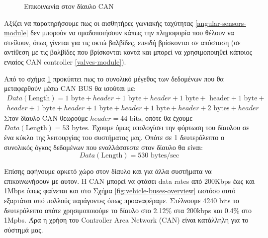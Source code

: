 \documentclass{article}
\begin{document}
\begin{figure}[H]
\caption{Επικοινωνία στον δίαυλο CAN}
\label{fig:inner-communications}
\end{figure}

Αξίζει να παρατηρήσουμε πως οι αισθητήρες γωνιακής ταχύτητας \ref{angular-sensors-module} δεν μπορούν να ομαδοποιήσουν κάπως την πληροφορία που θέλουν να στείλουν, όπως γίνεται για τις οκτώ βαλβίδες, επειδή βρίσκονται σε απόσταση (σε αντίθεση με τις βαλβίδες που βρίσκονται κοντά και μπορεί να χρησιμοποιηθεί κάποιος ενιαίος CAN controller \ref{valves-module}).
\par
Από το σχήμα \ref{fig:inner-communications} προκύπτει πως το συνολικό μέγεθος των δεδομένων που θα μεταφερθούν μέσω CAN BUS θα ισούται με:  
\begin{multline*}Data(\text{Length}) = 1 \text{ byte} + header + 1 \text{ byte} + header + 1 \text{ byte} + \text{ header} + 1 \text{ byte} +\\
header + 1 \text{ byte} + header + 1 \text{ byte} + header + 1 \text{ byte} + header + 2 \text{ bytes} + header\end{multline*}
Στον δίαυλο CAN θεωρούμε \(header=44 \text{ bits}\), οπότε θα έχουμε $Data(\text{Length}) = 53 \text{ bytes}$.
Έχουμε όμως υπολογίσει την φόρτωση του δίαυλου σε ένα κύκλο της λειτουργίας του συστήματος μας.
Οπότε σε 1 δευτερόλεπτο ο συνολικός όγκος δεδομένων που εναλλάσσεστε στον δίαυλο θα είναι:
\[Data(\text{Length}) = 530 \text{ bytes/sec}\]
\par
Επίσης αφήνουμε αρκετό χώρο στον δίαυλο και για άλλα συστήματα να επικοινωνήσουν με αυτον. Η CAN μπορεί να φτάσει data rates από 200Kbps έως και 1Mbps όπως φαίνεται και στο Σχήμα \ref{fig:vehicle-buses-overview} ωστόσο αυτό εξαρτάται από πολλούς παράγοντες όπως προαναφέραμε. Στέλνουμε 4240 bits το δευτερόλεπτο οπότε χρησιμοποιούμε το δίαυλο στο 2.12\% στα 200kbps και 0.4\% στο 1Mpbs. Άρα η χρήση του Controller Area Network (CAN) είναι κατάλληλη για το σύστημά μας.
\end{document}
